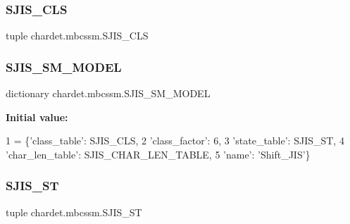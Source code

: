 \subsubsection{\texorpdfstring{S\+J\+I\+S\+\_\+\+C\+LS}{SJIS\_CLS}}
{\footnotesize\ttfamily tuple chardet.\+mbcssm.\+S\+J\+I\+S\+\_\+\+C\+LS}

\mbox{\label{namespacechardet_1_1mbcssm_a78edb0061ee6849fc919f086b3152458}} 
\subsubsection{\texorpdfstring{S\+J\+I\+S\+\_\+\+S\+M\+\_\+\+M\+O\+D\+EL}{SJIS\_SM\_MODEL}}
{\footnotesize\ttfamily dictionary chardet.\+mbcssm.\+S\+J\+I\+S\+\_\+\+S\+M\+\_\+\+M\+O\+D\+EL}

{\bfseries Initial value\+:}
\begin{DoxyCode}
1 =  \{\textcolor{stringliteral}{'class\_table'}: SJIS\_CLS,
2                \textcolor{stringliteral}{'class\_factor'}: 6,
3                \textcolor{stringliteral}{'state\_table'}: SJIS\_ST,
4                \textcolor{stringliteral}{'char\_len\_table'}: SJIS\_CHAR\_LEN\_TABLE,
5                \textcolor{stringliteral}{'name'}: \textcolor{stringliteral}{'Shift\_JIS'}\}
\end{DoxyCode}
\mbox{\label{namespacechardet_1_1mbcssm_a1fb9699394600576dca0a755fbabd4bb}} 
\subsubsection{\texorpdfstring{S\+J\+I\+S\+\_\+\+ST}{SJIS\_ST}}
{\footnotesize\ttfamily tuple chardet.\+mbcssm.\+S\+J\+I\+S\+\_\+\+ST}

